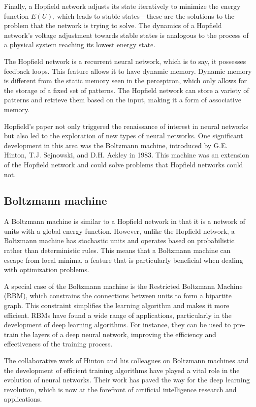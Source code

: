 \documentclass[paper=a4, fontsize=11pt]{scrartcl} %
\numberwithin{equation}{section} %
\numberwithin{figure}{section} %
\numberwithin{table}{section} %
\begin{document}
Finally, a Hopfield network adjusts its state iteratively to minimize the energy function \( E(U) \), which leads to stable states—these are the solutions to the problem that the network is trying to solve. The dynamics of a Hopfield network's voltage adjustment towards stable states is analogous to the process of a physical system reaching its lowest energy state.

The Hopfield network is a recurrent neural network, which is to say, it possesses feedback loops. This feature allows it to have dynamic memory. Dynamic memory is different from the static memory seen in the perceptron, which only allows for the storage of a fixed set of patterns. The Hopfield network can store a variety of patterns and retrieve them based on the input, making it a form of associative memory.

Hopfield's paper not only triggered the renaissance of interest in neural networks but also led to the exploration of new types of neural networks. One significant development in this area was the Boltzmann machine, introduced by G.E. Hinton, T.J. Sejnowski, and D.H. Ackley in 1983. This machine was an extension of the Hopfield network and could solve problems that Hopfield networks could not.

\subsection{Boltzmann machine}

A Boltzmann machine is similar to a Hopfield network in that it is a network of units with a global energy function. However, unlike the Hopfield network, a Boltzmann machine has stochastic units and operates based on probabilistic rather than deterministic rules. This means that a Boltzmann machine can escape from local minima, a feature that is particularly beneficial when dealing with optimization problems.

A special case of the Boltzmann machine is the Restricted Boltzmann Machine (RBM), which constrains the connections between units to form a bipartite graph. This constraint simplifies the learning algorithm and makes it more efficient. RBMs have found a wide range of applications, particularly in the development of deep learning algorithms. For instance, they can be used to pre-train the layers of a deep neural network, improving the efficiency and effectiveness of the training process.

The collaborative work of Hinton and his colleagues on Boltzmann machines and the development of efficient training algorithms have played a vital role in the evolution of neural networks. Their work has paved the way for the deep learning revolution, which is now at the forefront of artificial intelligence research and applications.
\end{document}

